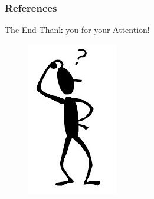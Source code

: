 \documentclass[hyperref={pdfpagelabels=false}]{beamer}
\begin{document}
\begin{frame}[allowframebreaks]
	\frametitle{References}
	\nocite{KernelBasedObjectTracking}
	
	
\end{frame}

\begin{frame}{The End}
\centering
\LARGE
\color{red}
 Thank you for your Attention!
 \nocite{BeamerTheme}
\end{frame}

\begin{frame}
\centering
\begin{figure}
	\includegraphics{images/who.png}
\end{figure}
\end{frame}
\end{document}
